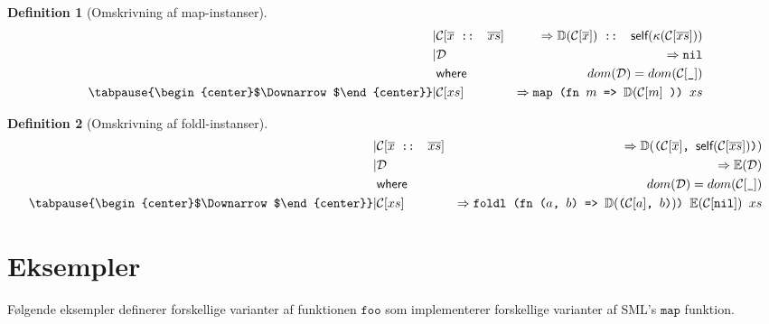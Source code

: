 \documentclass[oneside]{memoir}
\theoremstyle{definition}
\newtheorem{definition}{Definition}
\begin{document}
\begin{definition}[Omskrivning af \textsf{map}-instanser]

  \begin{eqnarray*}[rqrl]
    | & \mathcal{C}  [\overline{x} \texttt{ :: } \overline{xs}] &  => \mathbb{D}
    (\mathcal{C}[ \overline{x}]) \texttt{ :: } \textsf{self}(\kappa ( \mathcal{C}
    [ \overline{xs} ] ) ) \\
    | & \mathcal{D} & => \texttt{nil}\\
    & \textsf{where}\ \ & dom(\mathcal{D}) = dom(\mathcal{C}[\texttt{\_}])\\
   \tabpause{\begin{center}$\Downarrow$\end{center}}
    | & \mathcal{C} [ xs ] & => \texttt{map (fn $m$ => $\mathbb{D}(\mathcal{C} [ m ]$ )) $xs$}
  \end{eqnarray*}
\end{definition}

\begin{definition}[Omskrivning af \textsf{foldl}-instanser] \ \\

  \begin{eqnarray*}[rqrl]
    | & \mathcal{C}[\overline{x} \texttt{ :: } \overline{xs}] &  => \mathbb{D} ( \texttt{($\mathcal{C}
      [\overline{x}]$, $\textsf{self}( \mathcal{C}[\overline{xs}])$)} ) \\
    | & \mathcal{D} & => \mathbb{E}(\mathcal{D})\\
    & \textsf{where}\ \ & dom(\mathcal{D}) = dom(\mathcal{C}[\texttt{\_}])\\
    \tabpause{\begin{center}$\Downarrow$\end{center}}  
    | & \mathcal{C} [xs] & => \texttt{foldl (fn ($a$, $b$) => $\mathbb{D}($($\mathcal{C}[a]$, $b$)$)$) $\mathbb{E}(\mathcal{C}[\texttt{nil}])$ $xs$}
  \end{eqnarray*}

  
\end{definition}

\section{Eksempler}

Følgende eksempler definerer forskellige varianter af funktionen $\texttt{foo}$
som implementerer forskellige varianter af SML's $\texttt{map}$ funktion.
\end{document}
